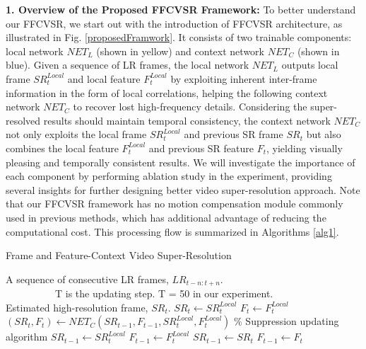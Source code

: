 \documentclass[letterpaper]{article} %
\begin{document}
\textbf{1. Overview of the Proposed FFCVSR Framework:} To better understand our FFCVSR, we start out with the introduction of FFCVSR architecture, as illustrated in Fig. \ref{proposedFramwork}. It consists of two trainable components: local network $NET_L$ (shown in yellow) and context network $NET_C$ (shown in blue). Given a sequence of LR frames, the local network $NET_L$ outputs local frame $SR^{Local}_t$ and local feature $F^{Local}_t$ by exploiting inherent inter-frame information in the form of local correlations, helping the following context network $NET_C$ to recover lost high-frequency details. Considering the super-resolved results should maintain temporal consistency, the context network $NET_C$ not only exploits the local frame $SR^{Local}_t$ and previous SR frame $SR_t$ but also combines the local feature $F^{Local}_t$ and previous SR feature $F_t$, yielding visually pleasing and temporally consistent results. We will investigate the importance of each component by performing ablation study in the experiment, providing several insights for further designing better video super-resolution approach. Note that our FFCVSR framework has no motion compensation module commonly used in previous methods, which has additional advantage of reducing the computational cost. This processing flow is summarized in Algorithms \ref{alg1}.




\begin{algorithm}
\caption{Frame and Feature-Context Video Super-Resolution}
\label{alg1}
\begin{algorithmic}
\REQUIRE A sequence of consecutive LR frames, $LR_{t-n:t+n}$. \\
~~~~~~~~~~T is the updating step. T = 50 in our experiment.\\
\ENSURE Estimated high-resolution frame, $SR_t$.
\STATE $SR_t \gets SR^{Local}_t$
\STATE $F_t \gets F^{Local}_t$
\ELSE
\STATE $(SR_t, F_t) \gets NET_C(SR_{t-1}, F_{t-1}, SR^{Local}_t, F^{Local}_t)$
\ENDIF
\ENDFOR
\STATE $\%$ Suppression updating algorithm
\STATE $ SR_{t-1} \gets SR^{Local}_t$
\STATE $ F_{t-1} \gets F^{Local}_t$
\ELSE
\STATE $ SR_{t-1} \gets SR_t$
\STATE $ F_{t-1} \gets F_t$
\ENDIF
\end{algorithmic}
\end{algorithm}
\end{document}
